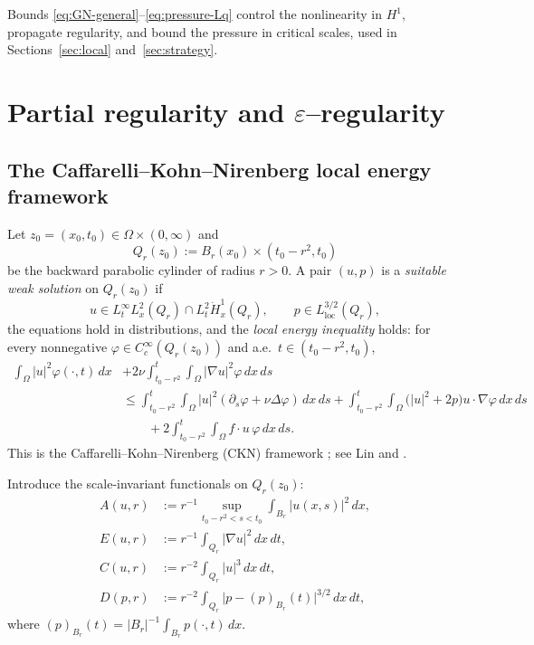 \IfFileExists{nyjm.cls}{\documentclass[11pt]{nyjm}}{\documentclass[11pt]{amsart}}
\theoremstyle{plain}
\theoremstyle{definition}
\theoremstyle{remark}
\begin{document}
\medskip
Bounds \eqref{eq:GN-general}–\eqref{eq:pressure-Lq} control the nonlinearity in $H^1$, propagate regularity, and bound the pressure in critical scales, used in Sections~\ref{sec:local} and~\ref{sec:strategy}.

\section{Partial regularity and $\varepsilon$–regularity}\label{sec:ckn}

\subsection{The Caffarelli–Kohn–Nirenberg local energy framework}\label{subsec:ckn-framework}
Let $z_0=(x_0,t_0)\in \Omega\times(0,\infty)$ and
\[
Q_r(z_0):=B_r(x_0)\times (t_0-r^2,t_0)
\]
be the backward parabolic cylinder of radius $r>0$. A pair $(u,p)$ is a \emph{suitable weak solution} on $Q_r(z_0)$ if
\[
u\in L^\infty_t L^2_x(Q_r)\cap L^2_t \dot H^1_x(Q_r),\qquad p\in L^{3/2}_{\mathrm{loc}}(Q_r),
\]
the equations hold in distributions, and the \emph{local energy inequality} holds: for every nonnegative $\varphi\in C_c^\infty(Q_r(z_0))$ and a.e.\ $t\in(t_0-r^2,t_0)$,
\begin{align}\label{eq:local-energy}
\int_{\Omega} |u|^2 \varphi(\cdot,t)\,dx
&+ 2\nu \int_{t_0-r^2}^{t}\!\!\int_{\Omega} |\nabla u|^2 \varphi \,dx\,ds \\
&\le \int_{t_0-r^2}^{t}\!\!\int_{\Omega} |u|^2(\partial_s\varphi+\nu\Delta\varphi)\,dx\,ds
+ \int_{t_0-r^2}^{t}\!\!\int_{\Omega} \big(|u|^2+2p\big) u\cdot\nabla\varphi\,dx\,ds \nonumber\\
&\qquad + 2\int_{t_0-r^2}^{t}\!\!\int_{\Omega} f\cdot u\,\varphi\,dx\,ds. \nonumber
\end{align}
This is the Caffarelli–Kohn–Nirenberg (CKN) framework \cite{CKN1982}; see Lin \cite{Lin1998} and \cite{LadyzhenskayaSereginSverak1999,Vasseur2007,SereginBook}.

Introduce the scale-invariant functionals on $Q_r(z_0)$:
\begin{equation}\label{eq:scaled-functionals}
\begin{aligned}
A(u,r) &:= r^{-1}\sup_{t_0-r^2<s<t_0}\int_{B_r} |u(x,s)|^2\,dx,\\
E(u,r) &:= r^{-1}\int_{Q_r} |\nabla u|^2\,dx\,dt,\\
C(u,r) &:= r^{-2}\int_{Q_r} |u|^3\,dx\,dt,\\
D(p,r) &:= r^{-2}\int_{Q_r} \big|p-(p)_{B_r}(t)\big|^{3/2}\,dx\,dt,
\end{aligned}
\end{equation}
where $(p)_{B_r}(t)=|B_r|^{-1}\int_{B_r} p(\cdot,t)\,dx$.
\end{document}

